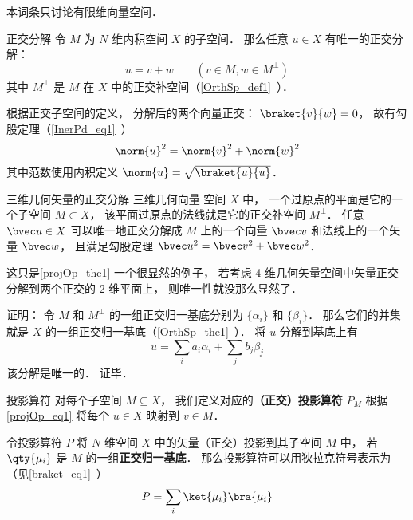 

本词条只讨论有限维向量空间．

\begin{theorem}{正交分解}\label{projOp_the1}
令 $M$ 为 $N$ 维内积空间 $X$ 的子空间． 那么任意 $u\in X$ 有唯一的正交分解：
\begin{equation}\label{projOp_eq1}
u = v + w \qquad (v\in M, w\in M^\bot)
\end{equation}
其中 $M^\bot$ 是 $M$ 在 $X$ 中的正交补空间（\autoref{OrthSp_def1}~）．
\end{theorem}
根据正交子空间的定义， 分解后的两个向量正交： $\braket{v}{w} = 0$， 故有勾股定理（\autoref{InerPd_eq1}~）
\begin{equation}
\norm{u}^2 = \norm{v}^2 + \norm{w}^2
\end{equation}
其中范数使用内积定义 $\norm{u} = \sqrt{\braket{u}{u}}$．

\begin{example}{三维几何矢量的正交分解}
三维几何向量 空间 $X$ 中， 一个过原点的平面是它的一个子空间 $M \subset X$， 该平面过原点的法线就是它的正交补空间 $M^\bot$．  任意 $\bvec u \in X$ 可以唯一地正交分解成 $M$ 上的一个向量 $\bvec v$ 和法线上的一个矢量 $\bvec w$， 且满足勾股定理 $\bvec u^2 = \bvec v^2 + \bvec w^2$．

这只是\autoref{projOp_the1} 一个很显然的例子， 若考虑 4 维几何矢量空间中矢量正交分解到两个正交的 2 维平面上， 则唯一性就没那么显然了．
\end{example}

证明： 令 $M$ 和 $M^\bot$ 的一组正交归一基底分别为 $\{\alpha_i\}$ 和 $\{\beta_i\}$． 那么它们的并集就是 $X$ 的一组正交归一基底（\autoref{OrthSp_the1}~）． 将 $u$ 分解到基底上有
\begin{equation}
u = \sum_i a_i \alpha_i + \sum_j b_j \beta_j
\end{equation}
该分解是唯一的． 证毕．

\begin{definition}{投影算符}
对每个子空间 $M\subseteq X$， 我们定义对应的\textbf{（正交）投影算符} $P_M$ 根据\autoref{projOp_eq1} 将每个 $u\in X$ 映射到 $v\in M$．
\end{definition}

\begin{theorem}{}
令投影算符 $P$ 将 $N$ 维空间 $X$ 中的矢量（正交）投影到其子空间 $M$ 中， 若 $\qty{\mu_i}$ 是 $M$ 的一组\textbf{正交归一基底}． 那么投影算符可以用狄拉克符号表示为（见\autoref{braket_eq1}~）
\begin{equation}
P = \sum_i \ket{\mu_i}\bra{\mu_i}
\end{equation}
\end{theorem}



